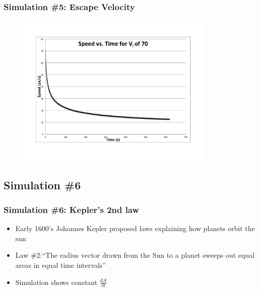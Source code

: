 \documentclass{beamer}
\begin{document}
\begin{frame}
\frametitle{Simulation \#5: Escape Velocity}

\begin{figure}[h] 
	\centering
		\includegraphics[width=9.5cm]{fig3.pdf}

	\label{fig:data1}
\end{figure}
\end{frame}


\subsection{Simulation \#6}

\begin{frame}

\frametitle{Simulation \#6: Kepler's 2nd law}

\begin{itemize}

\item Early 1600's Johannes Kepler proposed laws explaining how planets orbit the sun

 \item Law \#2:``The radius vector drawn from the Sun to a planet sweeps out equal areas in equal time intervals''

\item Simulation shows constant $\frac{dA}{dt}$

\end{itemize}
\end{frame}
\end{document}

